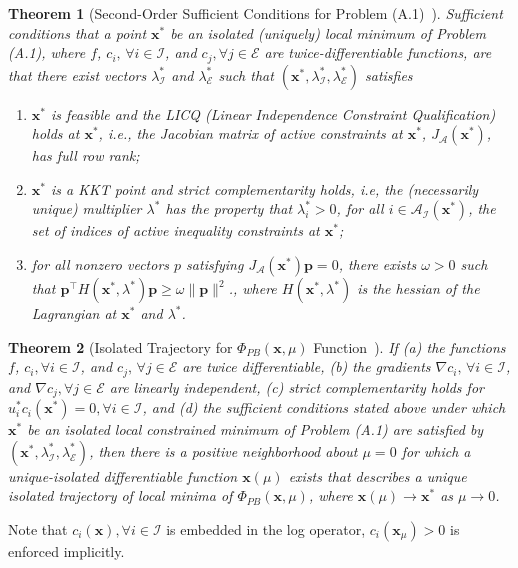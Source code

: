 \documentclass[12pt]{article}
\newcommand{\itl}{\intercal}
\newcommand{\bs}{ \boldsymbol}
\newcommand{\lt}{\left}
\newcommand{\rt}{\right}
\newtheorem{theorem}{Theorem}[section]
\begin{document}
\begin{theorem}[Second-Order Sufficient Conditions for Problem (A.1)~\cite{fiacco, Forsgren2002}]
	Sufficient conditions that a point $\bs{x}^*$ be an isolated (uniquely) local minimum of Problem (A.1), where $f$, $c_i, \, \forall i \in \mathcal{I}$, and $c_j, \forall j \in \mathcal{E}$ are twice-differentiable functions, are that there exist vectors $\lambda_{\mathcal{I}}^*$ and $\lambda_{\mathcal{E}}^*$ such that $\lt(\bs{x}^*, \lambda_{\mathcal{I}}^*, \lambda_{\mathcal{E}}^*\rt)$ satisfies
	\begin{enumerate}
		\item $\bs{x}^*$ is feasible and the LICQ (Linear Independence Constraint Qualification) holds at $\bs{x}^*$, i.e., the Jacobian matrix of active constraints at $\bs{x}^*$, $J_{\mathcal{A}}(\bs{x}^*)$, has full row rank;
		\item $\bs{x}^*$ is a KKT point and strict complementarity holds, i.e, the (necessarily unique) multiplier $\lambda^*$ has the property that $\lambda_i^* > 0$, for all $i  \in \mathcal{A}_{\mathcal{I}}(\bs{x}^*)$, the set of indices of active inequality constraints at $\bs{x}^*$;
		\item for all nonzero vectors $p$ satisfying $J_{\mathcal{A}}(\bs{x}^*)\bs{p} = 0$, there exists $\omega > 0$ such that $\bs{p}^{\itl}H(\bs{x}^*, \lambda^*) \bs{p} \ge \omega \|\bs{p}\|^2$., where $H(\bs{x}^*, \lambda^*) $ is the hessian of the Lagrangian at $\bs{x}^*$ and $\lambda^*$.
	\end{enumerate}
\end{theorem}
\begin{theorem}[Isolated Trajectory for $\Phi_{PB}(\bs{x}, \mu)$ Function~\cite{fiacco, Forsgren2002}]
	If (a) the functions $f$, $c_i, \forall i \in \mathcal{I}$, and $c_j, \,\forall j \in \mathcal{E}$ are twice differentiable, (b) the gradients $\nabla c_i, \,\forall i \in \mathcal{I}$, and $\nabla c_j, \forall j \in \mathcal{E}$ are linearly independent, (c) strict complementarity holds for  $u_i^* c_i (\bs{x}^*) = 0, \forall i \in \mathcal{I}$, and (d) the sufficient conditions stated above under which $\bs{x}^*$ be an isolated local constrained minimum of Problem (A.1) are satisfied by $\lt(\bs{x}^*, \lambda_{\mathcal{I}}^*, \lambda_{\mathcal{E}}^*\rt)$, then there is a positive neighborhood about $\mu = 0$ for which a unique-isolated differentiable function $\bs{x}(\mu)$ exists that describes a unique isolated trajectory of local minima of $\Phi_{PB}\lt(\bs{x}, \mu\rt)$, where $\bs{x}\lt(\mu\rt) \to \bs{x}^*$ as $\mu \to 0$.
\end{theorem}
Note that $c_i\lt(\bs{x}\rt), \forall i \in \mathcal{I}$ is embedded  in the log operator, $c_i(\bs{x}_\mu)> 0$ is enforced implicitly.
\end{document}
